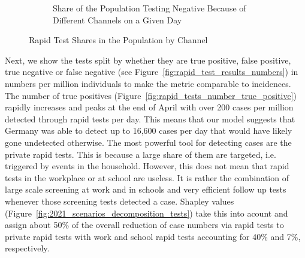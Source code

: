 \begin{figure}[ht]
\begin{subfigure}[b]{0.3\textwidth}
      \caption{Share of the Population Testing Negative Because of Different Channels
      on a Given Day}
      \label{fig:neg_rapid_tests_by_channel}
  \end{subfigure}
  \caption{Rapid Test Shares in the Population by Channel}
\end{figure}

\FloatBarrier

Next, we show the tests split by whether they are true positive, false positive, true
negative or false negative (see Figure~\ref{fig:rapid_test_results_numbers}) in numbers
per million individuals to make the metric comparable to incidences.
The number of true positives (Figure~\ref{fig:rapid_tests_number_true_positive}) rapidly
increases and peaks at the end of April with over 200 cases per million detected through
rapid tests per day. This means that our model suggests that Germany was able to detect
up to 16,600 cases per day that would have likely gone undetected otherwise. The most
powerful tool for detecting cases are the private rapid tests. This is because a large
share of them are targeted, i.e. triggered by events in the household. However, this
does not mean that rapid tests in the workplace or at school are useless. It is rather
the combination of large scale screening at work and in schools and very efficient
follow up tests whenever those screening tests detected a case. Shapley values
(Figure~\ref{fig:2021_scenarios_decomposition_tests}) take this into acount and
assign about 50\% of the overall reduction of case numbers via rapid tests to private
rapid tests with work and school rapid tests accounting for 40\% and 7\%,
respectively.

